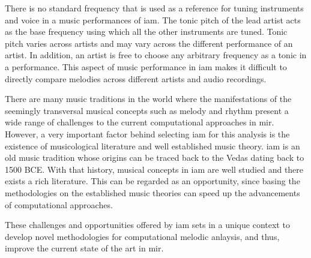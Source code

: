 There is no standard frequency that is used as a reference for tuning instruments and voice in a music performances of \gls{iam}. The tonic pitch of the lead artist acts as the base frequency using which all the other instruments are tuned. Tonic pitch varies across artists and may vary across the different performance of an artist. In addition, an artist is free to choose any arbitrary frequency as a tonic in a performance. This aspect of music performance in \gls{iam} makes it difficult to directly compare melodies across different artists and audio recordings. 

There are many music traditions in the world where the manifestations of the seemingly transversal musical concepts such as melody and rhythm present a wide range of challenges to the current computational approaches in \gls{mir}. However, a very important factor behind selecting \gls{iam} for this analysis is the existence of musicological literature and well established music theory. \gls{iam} is an old music tradition whose origins can be traced back to the Vedas dating back to 1500 BCE. With that history, musical concepts in \gls{iam} are well studied and there exists a rich literature. This can be regarded as an opportunity, since basing the methodologies on the established music theories can speed up the advancements of computational approaches. 






These challenges and opportunities offered by \gls{iam} sets in a unique context to develop novel methodologies for computational melodic anlaysis, and thus, improve the current state of the art in \gls{mir}. 






